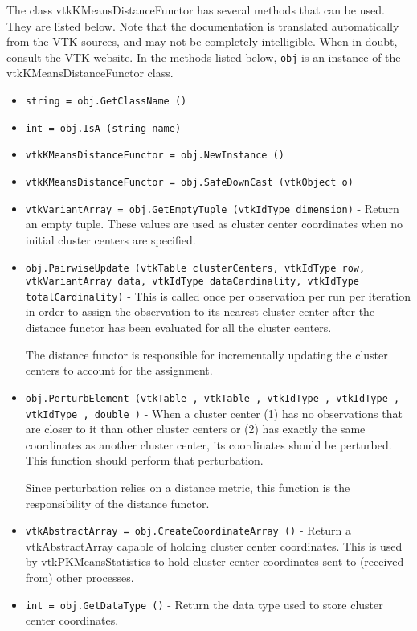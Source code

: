 The class vtkKMeansDistanceFunctor has several methods that can be used.
  They are listed below.
Note that the documentation is translated automatically from the VTK sources,
and may not be completely intelligible.  When in doubt, consult the VTK website.
In the methods listed below, \verb|obj| is an instance of the vtkKMeansDistanceFunctor class.
\begin{itemize}
\item  \verb|string = obj.GetClassName ()|

\item  \verb|int = obj.IsA (string name)|

\item  \verb|vtkKMeansDistanceFunctor = obj.NewInstance ()|

\item  \verb|vtkKMeansDistanceFunctor = obj.SafeDownCast (vtkObject o)|

\item  \verb|vtkVariantArray = obj.GetEmptyTuple (vtkIdType dimension)| -  Return an empty tuple. These values are used as cluster center coordinates
 when no initial cluster centers are specified.

\item  \verb|obj.PairwiseUpdate (vtkTable clusterCenters, vtkIdType row, vtkVariantArray data, vtkIdType dataCardinality, vtkIdType totalCardinality)| -  This is called once per observation per run per iteration in order to assign the
 observation to its nearest cluster center after the distance functor has been
 evaluated for all the cluster centers.

 The distance functor is responsible for incrementally updating the cluster centers
 to account for the assignment.

\item  \verb|obj.PerturbElement (vtkTable , vtkTable , vtkIdType , vtkIdType , vtkIdType , double )| -  When a cluster center (1) has no observations that are closer to it than other cluster centers
 or (2) has exactly the same coordinates as another cluster center, its coordinates should be
 perturbed. This function should perform that perturbation.

 Since perturbation relies on a distance metric, this function is the responsibility of the
 distance functor.

\item  \verb|vtkAbstractArray = obj.CreateCoordinateArray ()| -  Return a vtkAbstractArray capable of holding cluster center coordinates.
 This is used by vtkPKMeansStatistics to hold cluster center coordinates sent to (received from) other processes.

\item  \verb|int = obj.GetDataType ()| -  Return the data type used to store cluster center coordinates.

\end{itemize}
